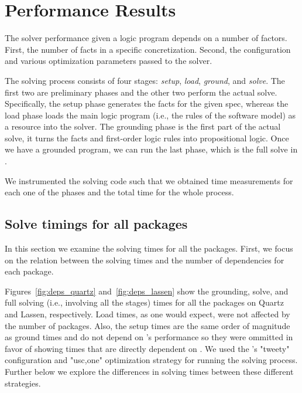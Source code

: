 \section{Performance Results}
\label{sec:perf-results}


The \clingo{} solver performance given a logic program depends on a number of factors. First, the number of facts in a specific concretization. Second, the configuration and various optimization parameters passed to the solver. 

The solving process consists of four stages: \emph{setup}, \emph{load}, \emph{ground}, and \emph{solve}. The first two are preliminary phases and the other two perform the actual solve. Specifically, the setup phase generates the facts for the given spec, whereas the load phase loads the main logic program (i.e., the rules of the software model) as a resource into the solver. The grounding phase is the first part of the actual solve, it turns the facts and first-order logic rules into propositional logic. Once we have a grounded program, we can run the last phase, which is the full solve in \clingo{}.

We instrumented the solving code such that we obtained time measurements for each one of the phases and the total time for the whole process.

\subsection{Solve timings for all packages}

In this section we examine the solving times for all the packages. First, we focus on the relation between the solving times and the number of dependencies for each package.





Figures~\ref{fig:deps_quartz} and~\ref{fig:deps_lassen} show the grounding, solve, and full solving (i.e., involving all the stages) times for all the packages on Quartz and Lassen, respectively. Load times, as one would expect, were not affected by the number of packages. Also, the setup times are the same order of magnitude as ground times and do not depend on \clingo{}'s performance so they were ommitted in favor of showing times that are directly dependent on \clingo{}. We used the \clingo{}'s "tweety" configuration and "usc,one" optimization strategy for running the solving process. Further below we explore the differences in solving times between these different strategies.

